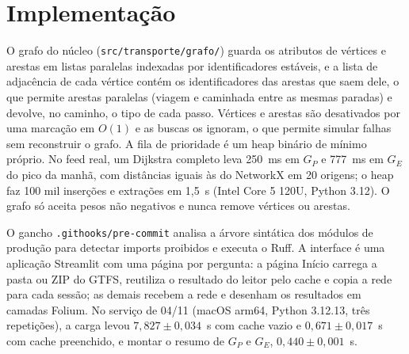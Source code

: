 \section{Implementação}\label{sec:impl}

O grafo do núcleo (\texttt{src/transporte/grafo/}) guarda os atributos de vértices e arestas em listas paralelas indexadas por identificadores
estáveis, e a lista de adjacência de cada vértice contém os identificadores das arestas que saem
dele, o que permite arestas paralelas (viagem e caminhada entre as mesmas paradas) e devolve, no
caminho, o tipo de cada passo. Vértices e arestas são desativados por uma marcação em $O(1)$ e
as buscas os ignoram, o que permite simular falhas sem reconstruir o grafo. A fila de prioridade
é um heap binário de mínimo próprio. No feed real, um Dijkstra completo leva 250~ms em $G_P$ e
777~ms em $G_E$ do pico da manhã, com distâncias iguais às do NetworkX em 20 origens; o heap faz
100 mil inserções e extrações em 1,5~s (Intel Core 5 120U, Python 3.12). O grafo só aceita pesos
não negativos e nunca remove vértices ou arestas.

O gancho \texttt{.githooks/pre-commit} analisa a árvore sintática dos módulos de produção para
detectar imports proibidos e executa o Ruff. A interface é uma aplicação Streamlit com uma
página por pergunta: a página Início carrega a pasta ou ZIP do GTFS, reutiliza o resultado do
leitor pelo cache e copia a rede para cada sessão; as demais recebem a rede e desenham os
resultados em camadas Folium. No serviço de 04/11 (macOS arm64, Python 3.12.13, três
repetições), a carga levou $7{,}827 \pm 0{,}034$~s com cache vazio e $0{,}671 \pm 0{,}017$~s com
cache preenchido, e montar o resumo de $G_P$ e $G_E$, $0{,}440 \pm 0{,}001$~s.
